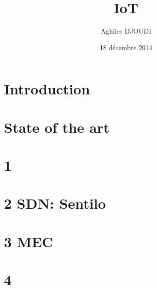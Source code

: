 \documentclass[a4paper, 12pt, twoside,openright]{report}
\title{IoT}
\author{Aghiles DJOUDI}
\date{18 décembre 2014}
\begin{document}
\preface
	
	
	
	
	
\body

% 
% 
% 
% 

\chapter{Introduction}
\minitoc
	

\chapter{State of the art \cite{bregell_hardware_2015}}
\minitoc
	
	
	
 	
 	

\chapter{1 \cite{bregell_hardware_2015}}
\minitoc
	
	
	
	
	
	
	

\chapter{2 SDN: Sentilo \cite{_contiki_2016a}}
\minitoc
	
	
	
	
	
	
	

\chapter{3 MEC}
\minitoc
	
	
	
	
	
	
	

\chapter{4}
\minitoc
	
	
	
	
	
	
	
\end{document}
